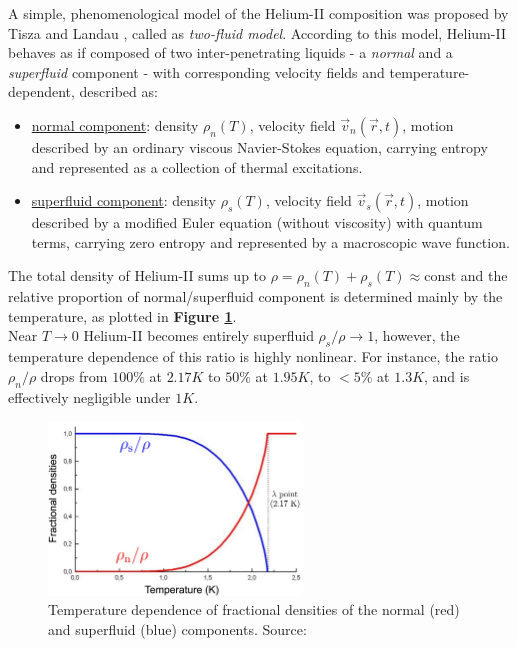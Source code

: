 	A simple, phenomenological model of the Helium-II composition was proposed by Tisza \cite{tisza} and Landau \cite{landau}, called as \textit{two-fluid model}. According to this model, Helium-II behaves as if composed of two inter-penetrating liquids - a \textit{normal} and a \textit{superfluid} component - with corresponding velocity fields and temperature-dependent, described as:

	\begin{itemize}
		\item \underline{normal component}: density $\rho_n (T)$, velocity field $\vec{v}_n (\vec{r}, t)$, motion described by an ordinary viscous Navier-Stokes equation, carrying entropy and represented as a collection of thermal excitations.
		\item \underline{superfluid component}: density $\rho_s (T)$, velocity field $\vec{v}_s(\vec{r}, t)$, motion described by a modified Euler equation (without viscosity) with quantum terms, carrying zero entropy and represented by a macroscopic wave function.
	\end{itemize}

	The total density of Helium-II sums up to $\rho = \rho_n(T) + \rho_s(T) \approx \text{const}$ and the relative proportion of normal/superfluid component is determined mainly by the temperature, as plotted in \textbf{Figure \ref{densities}}.\\
	Near $T \rightarrow 0$ Helium-II becomes entirely superfluid $\rho_s/\rho \rightarrow 1$, however, the temperature dependence of this ratio is highly nonlinear. For instance, the ratio $\rho_n/\rho$ drops from $100\%$ at $2.17\unit{K}$ to $50\%$ at $1.95\unit{K}$, to $<5\%$ at $1.3\unit{K}$, and is effectively negligible under $1\unit{K}$.

	\begin{figure}[h]
		\centering
		\includegraphics[width=0.6\textwidth]{graphics/theory/densities}
		\caption{Temperature dependence of fractional densities of the normal (red) and superfluid (blue) components. Source:\cite{svoc2016}}
		\label{densities}
	\end{figure}

